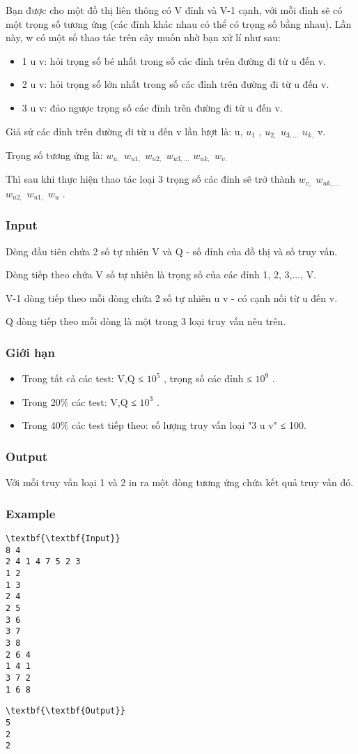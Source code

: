 

Bạn được cho một đồ thị liên thông có V đỉnh và V-1 cạnh, với mỗi đỉnh sẽ có một trọng số tương ứng (các đỉnh khác nhau có thể có trọng số bằng nhau). Lần này, w có một số thao tác trên cây muốn nhờ bạn xử lí như sau:
\begin{itemize}
	\item 1 u v: hỏi trọng số bé nhất trong số các đỉnh trên đường đi từ u đến v.
	\item 2 u v: hỏi trọng số lớn nhất trong số các đỉnh trên đường đi từ u đến v.
	\item 3 u v: đảo ngược trọng số các đỉnh trên đường đi từ u đến v.
\end{itemize}

Giả sử các đỉnh trên đường đi từ u đến v lần lượt là: u, $u_{1}$ , $u_{2,}$ $u_{3,...}$ $u_{k}$$_ , $ v.

Trọng số tương ứng là: $w_{u,}$ $w_{u1,}$ $w_{u2,}$ $w_{u3,...}$ $w_{uk,}$ $w_{v.}$

Thì sau khi thực hiện thao tác loại 3 trọng số các đỉnh sẽ trở thành $w_{v,}$ $w_{uk,...}$ $w_{u2,}$ $w_{u1,}$ $w_{u}$ .

\subsubsection{Input}

Dòng đầu tiên chứa 2 số tự nhiên V và Q - số đỉnh của đồ thị và số truy vấn.

Dòng tiếp theo chứa V số tự nhiên là trọng số của các đỉnh 1, 2, 3,..., V.

V-1 dòng tiếp theo mỗi dòng chứa 2 số tự nhiên u v - có cạnh nối từ u đến v.

Q dòng tiếp theo mỗi dòng là một trong 3 loại truy vấn nêu trên.

\subsubsection{Giới hạn}
\begin{itemize}
	\item Trong tất cả các test: V,Q ≤ $10^{5}$ , trọng số các đỉnh ≤ $10^{9}$ .
	\item Trong 20\% các test: V,Q ≤ $10^{3}$ .
	\item Trong 40\% các test tiếp theo: số lượng truy vấn loại "3 u v" ≤ 100.
\end{itemize}

\subsubsection{Output}

Với mỗi truy vấn loại 1 và 2 in ra một dòng tương ứng chứa kết quả truy vấn đó.

\subsubsection{Example}
\begin{verbatim}
\textbf{\textbf{Input}}
8 4
2 4 1 4 7 5 2 3
1 2
1 3
2 4
2 5
3 6
3 7
3 8
2 6 4
1 4 1
3 7 2
1 6 8
\end{verbatim}
\begin{verbatim}
\textbf{\textbf{Output}}
5
2
2\end{verbatim}
